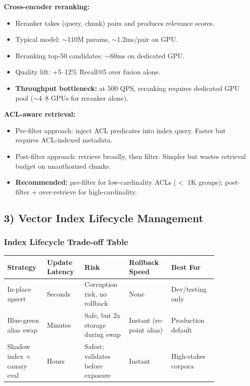 \textbf{Cross-encoder reranking:}

\begin{itemize}
  \item Reranker takes (query, chunk) pairs and produces relevance scores.
  \item Typical model: $\sim$110M params, $\sim$1.2ms/pair on GPU.
  \item Reranking top-50 candidates: $\sim$60ms on dedicated GPU.
  \item Quality lift: +5--12\% Recall@5 over fusion alone.
  \item \textbf{Throughput bottleneck:} at 500 QPS, reranking requires dedicated GPU pool ($\sim$4--8 GPUs for reranker alone).
\end{itemize}

\textbf{ACL-aware retrieval:}

\begin{itemize}
  \item Pre-filter approach: inject ACL predicates into index query. Faster but requires ACL-indexed metadata.
  \item Post-filter approach: retrieve broadly, then filter. Simpler but wastes retrieval budget on unauthorized chunks.
  \item \textbf{Recommended:} pre-filter for low-cardinality ACLs ($<$ 1K groups); post-filter + over-retrieve for high-cardinality.
\end{itemize}

\subsection*{3) Vector Index Lifecycle Management}

\subsubsection*{Index Lifecycle Trade-off Table}

\small
\begin{tabular}{|p{0.16\linewidth}|p{0.15\linewidth}|p{0.19\linewidth}|p{0.18\linewidth}|p{0.18\linewidth}|}
\hline
\textbf{Strategy} & \textbf{Update Latency} & \textbf{Risk} & \textbf{Rollback Speed} & \textbf{Best For} \\
\hline
In-place upsert & Seconds & Corruption risk, no rollback & None & Dev/testing only \\
\hline
Blue-green alias swap & Minutes & Safe, but 2x storage during swap & Instant (re-point alias) & Production default \\
\hline
Shadow index + canary eval & Hours & Safest; validates before exposure & Instant & High-stakes corpora \\
\hline
\end{tabular}
\normalsize

